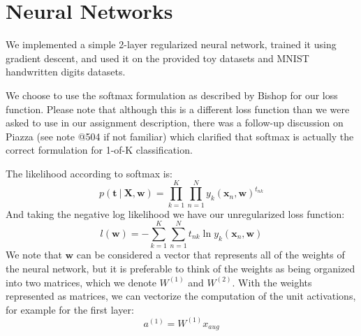 \documentclass[10pt]{article}
\begin{document}
 



\section{Neural Networks}

We implemented a simple 2-layer regularized neural network, trained it using gradient descent, and used it on the provided toy datasets and MNIST handwritten digits datasets.

We choose to use the softmax formulation as described by Bishop for our loss function.  Please note that although this is a different loss function than we were asked to use in our assignment description, there was a follow-up discussion on Piazza (see note @504 if not familiar) which clarified that softmax is actually the correct formulation for 1-of-K classification.

The likelihood according to softmax is:
%
%
\begin{equation}
p(\mathbf{t} \ | \ \mathbf{X}, \mathbf{w}) = \prod_{k=1}^K \prod_{n=1}^N y_k(\mathbf{x}_n,\mathbf{w})^{t_{nk}}
\end{equation}
%
%
And taking the negative log likelihood we have our unregularized loss function:
%
%
\begin{equation}
l(\mathbf{w})= - \sum_{k=1}^K \sum_{n=1}^N  t_{nk} \ln y_k(\mathbf{x}_n,\mathbf{w}) 
\end{equation}
%
%
We note that $\mathbf{w}$ can be considered a vector that represents all of the weights of the neural network, but it is preferable to think of the weights as being organized into two matrices, which we denote $W^{(1)}$ and $W^{(2)}$.  With the weights represented as matrices, we can vectorize the computation of the unit activations, for example for the first layer:
%
%
\begin{equation}
a^{(1)} = W^{(1)} x_{aug}
\end{equation}
%
%
\end{document}
